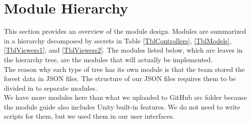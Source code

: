 \documentclass[12pt, titlepage]{article}
\begin{document}
\newpage

\section{Module Hierarchy} \label{SecMH}

This section provides an overview of the module design. Modules are summarized
in a hierarchy decomposed by secrets in Table \ref{TblControllers},  \ref{TblModels}, \ref{TblViewers1}, and \ref{TblViewers2}. The modules listed
below, which are leaves in the hierarchy tree, are the modules that will
actually be implemented.\\
The reason why each type of tree has its own module is that the team stored the forest data in JSON files. The structure of our JSON files requires them to be divided in to separate modules.\\
We have more modules here than what we uploaded to GitHub src folder
because the module guide also includes Unity built-in features. We do 
not need to write scripts for them, but we used them in our user 
interfaces.\\
\end{document}

